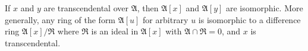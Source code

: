 If $x$ and $y$ are transcendental over $\mathfrak{A}$, then $\mathfrak{A}[x]$ and $\mathfrak{A}[y]$ are isomorphic. More generally, any ring of the form $\mathfrak{A}[u]$ for arbitrary $u$ is isomorphic to a difference ring $\mathfrak{A}[x]/\mathfrak{R}$ where $\mathfrak{R}$ is an ideal in $\mathfrak{A}[x]$ with $\mathfrak{A} \cap \mathfrak{R} = 0$, and $x$ is transcendental.
